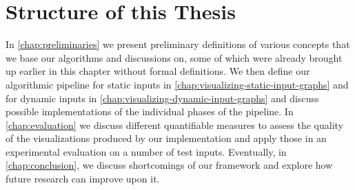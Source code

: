 \section{Structure of this Thesis}
\label{sect:structure-of-this-thesis}

In \cref{chap:preliminaries} we present preliminary definitions of various concepts that we base our algorithms and discussions on, some of which were already brought up earlier in this chapter without formal definitions.
We then define our algorithmic pipeline for static inputs in \cref{chap:visualizing-static-input-graphs} and for dynamic inputs in \cref{chap:visualizing-dynamic-input-graphs} and discuss possible implementations of the individual phases of the pipeline.
In \cref{chap:evaluation} we discuss different quantifiable measures to assess the quality of the visualizations produced by our implementation and apply those in an experimental evaluation on a number of test inputs.
Eventually, in \cref{chap:conclusion}, we discuss shortcomings of our framework and explore how future research can improve upon it.
